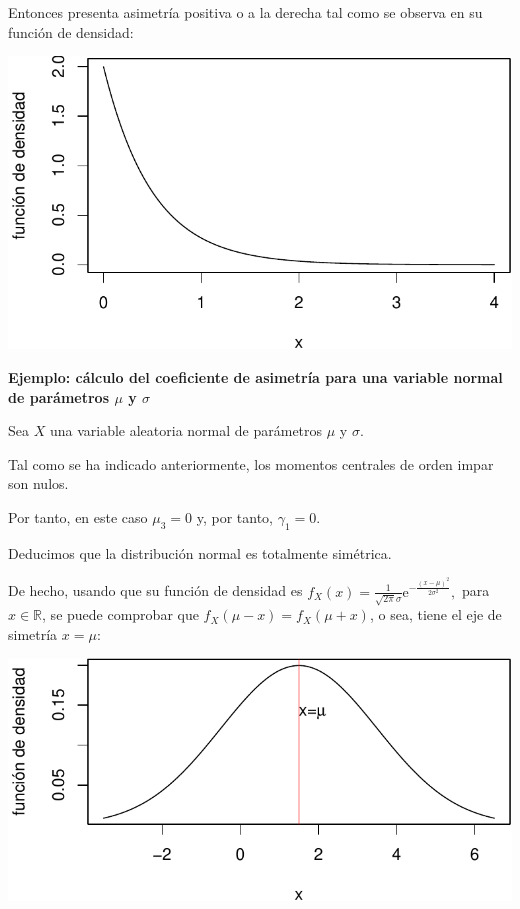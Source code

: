 \documentclass[
  letterpaper,
  DIV=11,
  numbers=noendperiod]{scrreprt}
\begin{document}
Entonces presenta asimetría positiva o a la derecha tal como se observa
en su función de densidad:

\includegraphics{4_files/figure-pdf/unnamed-chunk-3-1.pdf}

\textbf{Ejemplo: cálculo del coeficiente de asimetría para una variable
normal de parámetros \(\mu\) y \(\sigma\)}

Sea \(X\) una variable aleatoria normal de parámetros \(\mu\) y
\(\sigma\).

Tal como se ha indicado anteriormente, los momentos centrales de orden
impar son nulos.

Por tanto, en este caso \(\mu_3=0\) y, por tanto, \(\gamma_1=0\).

Deducimos que la distribución normal es totalmente simétrica.

De hecho, usando que su función de densidad es
\(f_X(x)=\frac{1}{\sqrt{2\pi}\sigma}\mathrm{e}^{-\frac{(x-\mu)^2}{2\sigma^2}},\)
para \(x\in \mathbb{R}\), se puede comprobar que
\(f_X(\mu-x)=f_X(\mu +x)\), o sea, tiene el eje de simetría \(x=\mu\):

\includegraphics{4_files/figure-pdf/unnamed-chunk-4-1.pdf}
\end{document}
